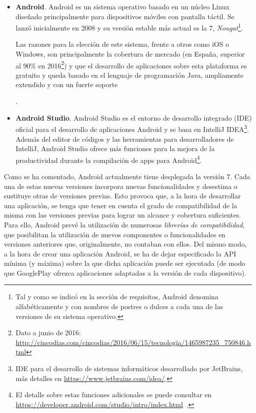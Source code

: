 \begin{itemize}
	\item{\textbf{Android}. Android es un sistema operativo basado en un núcleo Linux diseñado principalmente para dispositivos móviles con pantalla táctil. Se lanzó inicialmente en 2008 y su versión estable más actual es la 7, \textit{Nougat}\footnote{Tal y como se indicó en la sección de requisitos, Android denomina alfabéticamente y con nombres de postres o dulces a cada una de las versiones de su sistema operativo.}.
	
	Las razones para la elección de este sistema, frente a otros como iOS o Windows, son principalmente la cobertura de mercado (en España, superior al 90\% en 2016\footnote{Dato a junio de 2016: \url{http://cincodias.com/cincodias/2016/06/15/tecnologia/1465987235_750846.html}}) y que el desarrollo de aplicaciones sobre esta plataforma es gratuito y queda basado en el lenguaje de programación Java, ampliamente extendido y con un fuerte soporte}.
	
	\item{\textbf{Android Studio}. Android Studio es el entorno de desarrollo integrado (IDE) oficial para el desarrollo de aplicaciones Android y se basa en IntelliJ IDEA\footnote{IDE para el desarrollo de sistemas informáticos desarrollado por JetBrains, más detalles en \url{https://www.jetbrains.com/idea/}.}. Además del editor de códigos y las herramientas para desarrolladores de IntelliJ, Android Studio ofrece más funciones para la mejora de la productividad durante la compilación de apps para Android\footnote{El detalle sobre estas funciones adicionales se puede consultar en \url{https://developer.android.com/studio/intro/index.html}~\cite{AnDev}.}}.
\end{itemize}

Como se ha comentado, Android actualmente tiene desplegada la versión 7. Cada una de estas nuevas versiones incorpora nuevas funcionalidades y desestima o sustituye otras de versiones previas. Esto provoca que, a la hora de desarrollar una aplicación, se tenga que tener en cuenta el grado de compatibilidad de la misma con las versiones previas para lograr un alcance y cobertura suficientes. Para ello, Android prevé la utilización de numerosas \emph{librerías de compatibilidad}, que posibilitan la utilización de nuevos componentes o funcionalidades en versiones anteriores que, originalmente, no contaban con ellos. Del mismo modo, a la hora de crear una aplicación Android, se ha de dejar especificado la API mínima (y máxima) sobre la que dicha aplicación puede ser ejecutada (de modo que GooglePlay ofrezca aplicaciones adaptadas a la versión de cada dispositivo).

